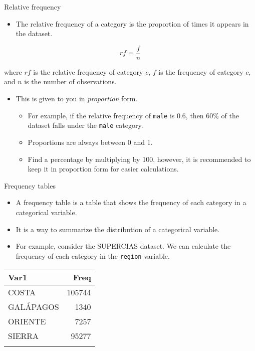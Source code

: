\documentclass[
  10pt,
  ignorenonframetext,
]{beamer}
\providecommand{\tightlist}{%
  \setlength{\itemsep}{0pt}\setlength{\parskip}{0pt}}\usepackage{longtable,booktabs,array}
\begin{document}
\begin{frame}[fragile]{Relative frequency}
\label{relative-frequency}
\begin{itemize}
\tightlist
\item
  The relative frequency of a category is the proportion of times it
  appears in the dataset.
\end{itemize}

\[ rf = \frac{f}{n} \]

where \(rf\) is the relative frequency of category \(c\), \(f\) is the
frequency of category \(c\), and \(n\) is the number of observations.

\begin{itemize}
\tightlist
\item
  This is given to you in \emph{proportion} form.

  \begin{itemize}
  \tightlist
  \item
    For example, if the relative frequency of \texttt{male} is 0.6, then
    60\% of the dataset falls under the \texttt{male} category.
  \item
    Proportions are always between 0 and 1.
  \item
    Find a percentage by multiplying by 100, however, it is recommended
    to keep it in proportion form for easier calculations.
  \end{itemize}
\end{itemize}
\end{frame}

\begin{frame}[fragile]{Frequency tables}
\label{frequency-tables}
\begin{itemize}
\item
  A frequency table is a table that shows the frequency of each category
  in a categorical variable.
\item
  It is a way to summarize the distribution of a categorical variable.
\item
  For example, consider the SUPERCIAS dataset. We can calculate the
  frequency of each category in the \texttt{region} variable.
\end{itemize}

\begin{longtable}[]{@{}lr@{}}
\toprule\noalign{}
Var1 & Freq \\
\midrule\noalign{}
\endhead
COSTA & 105744 \\
GALÁPAGOS & 1340 \\
ORIENTE & 7257 \\
SIERRA & 95277 \\
\bottomrule\noalign{}
\end{longtable}
\end{frame}
\end{document}
